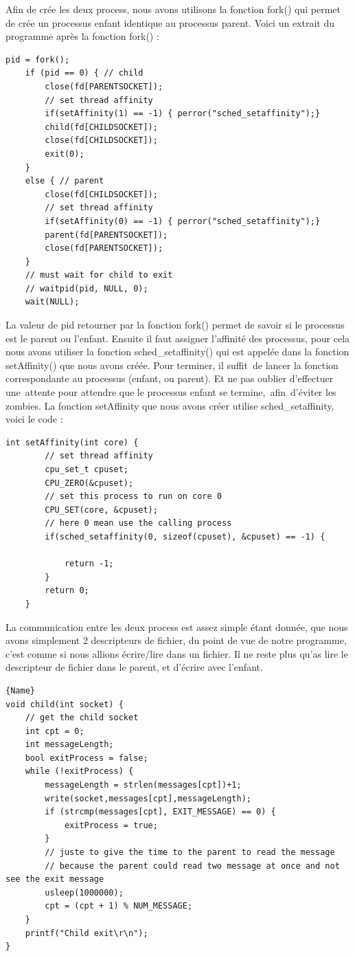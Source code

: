 \documentclass[
	a4paper, %
	10pt, %
]{CSUniSchoolLabReport}
\begin{document}
Afin de crée les deux process, nous avons utilisons la fonction fork() qui permet de crée un processus enfant identique au processus parent.
Voici un extrait du programme apr\`es la fonction fork() :
\begin{lstlisting}[style=CStyle, firstnumber=1]
	pid = fork();
    if (pid == 0) { // child 
        close(fd[PARENTSOCKET]); 
        // set thread affinity
        if(setAffinity(1) == -1) { perror("sched_setaffinity");}
        child(fd[CHILDSOCKET]);
        close(fd[CHILDSOCKET]);
        exit(0);
    }
    else { // parent 
        close(fd[CHILDSOCKET]);
        // set thread affinity
        if(setAffinity(0) == -1) { perror("sched_setaffinity");}
        parent(fd[PARENTSOCKET]);
        close(fd[PARENTSOCKET]);
    }
    // must wait for child to exit
    // waitpid(pid, NULL, 0);
    wait(NULL);
\end{lstlisting}
La valeur de pid retourner par la fonction fork() permet de savoir si le processus est le parent ou l'enfant.
Ensuite il faut assigner l'affinité des processus, pour cela nous avons utiliser la fonction sched\_setaffinity() qui est appelée dans la fonction setAffinity() que nous avons cré\'ee.
Pour terminer, il suffit\ de lancer la fonction correspondante au processus (enfant, ou parent).
Et ne pas oublier d'effectuer une\ attente pour attendre que le processus enfant se termine,\ afin\ d'\'eviter les zombies.
La fonction setAffinity que nous avons créer utilise sched\_setaffinity, voici le code : \\
\begin{lstlisting}[style=CStyle, firstnumber=1]
	int setAffinity(int core) {
		// set thread affinity
		cpu_set_t cpuset;
		CPU_ZERO(&cpuset);
		// set this process to run on core 0
		CPU_SET(core, &cpuset);
		// here 0 mean use the calling process
		if(sched_setaffinity(0, sizeof(cpuset), &cpuset) == -1) {
	
			return -1;
		}
		return 0;
	}
\end{lstlisting}
La communication entre les deux process est assez simple \'etant donnée, que nous avons simplement 2 descripteurs de fichier, du point de vue de notre programme, c'est comme si nous allions écrire/lire dans un fichier.
Il ne reste plus qu'as lire le descripteur de fichier dans le parent, et d'écrire avec l'enfant.\\
\noindent\begin{minipage}{.50\textwidth}
\begin{lstlisting}[style=CStyle, caption=Processus Enfant, firstnumber=1]{Name}
void child(int socket) {
	// get the child socket
	int cpt = 0;
	int messageLength;
	bool exitProcess = false;
	while (!exitProcess) {
		messageLength = strlen(messages[cpt])+1;
		write(socket,messages[cpt],messageLength);
		if (strcmp(messages[cpt], EXIT_MESSAGE) == 0) {
			exitProcess = true;
		}
		// juste to give the time to the parent to read the message
		// because the parent could read two message at once and not see the exit message
		usleep(1000000); 
		cpt = (cpt + 1) % NUM_MESSAGE;
	}
	printf("Child exit\r\n");
}
\end{lstlisting}
\end{minipage}\hfill
\end{document}
